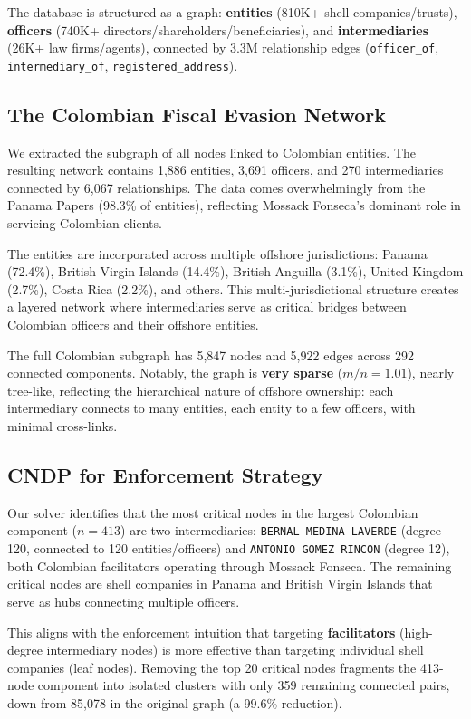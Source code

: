 \documentclass[11pt,a4paper]{article}
\begin{document}
The database is structured as a graph: \textbf{entities} (810K+ shell companies/trusts), \textbf{officers} (740K+ directors/shareholders/beneficiaries), and \textbf{intermediaries} (26K+ law firms/agents), connected by 3.3M relationship edges (\texttt{officer\_of}, \texttt{intermediary\_of}, \texttt{registered\_address}).

\subsection{The Colombian Fiscal Evasion Network}

We extracted the subgraph of all nodes linked to Colombian entities. The resulting network contains 1{,}886 entities, 3{,}691 officers, and 270 intermediaries connected by 6{,}067 relationships. The data comes overwhelmingly from the Panama Papers (98.3\% of entities), reflecting Mossack Fonseca's dominant role in servicing Colombian clients.

The entities are incorporated across multiple offshore jurisdictions: Panama (72.4\%), British Virgin Islands (14.4\%), British Anguilla (3.1\%), United Kingdom (2.7\%), Costa Rica (2.2\%), and others. This multi-jurisdictional structure creates a layered network where intermediaries serve as critical bridges between Colombian officers and their offshore entities.

The full Colombian subgraph has 5{,}847 nodes and 5{,}922 edges across 292 connected components. Notably, the graph is \textbf{very sparse} ($m/n = 1.01$), nearly tree-like, reflecting the hierarchical nature of offshore ownership: each intermediary connects to many entities, each entity to a few officers, with minimal cross-links.

\subsection{CNDP for Enforcement Strategy}

Our solver identifies that the most critical nodes in the largest Colombian component ($n=413$) are two intermediaries: \texttt{BERNAL MEDINA LAVERDE} (degree 120, connected to 120 entities/officers) and \texttt{ANTONIO GOMEZ RINCON} (degree 12), both Colombian facilitators operating through Mossack Fonseca. The remaining critical nodes are shell companies in Panama and British Virgin Islands that serve as hubs connecting multiple officers.

This aligns with the enforcement intuition that targeting \textbf{facilitators} (high-degree intermediary nodes) is more effective than targeting individual shell companies (leaf nodes). Removing the top 20 critical nodes fragments the 413-node component into isolated clusters with only 359 remaining connected pairs, down from 85{,}078 in the original graph (a 99.6\% reduction).
\end{document}
